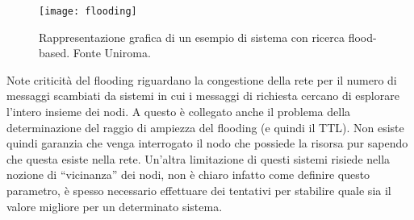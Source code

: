\begin{figure}[H]
 \centering
 \texttt{[image: flooding]}
 \caption{Rappresentazione grafica di un esempio di sistema con
  ricerca flood-based. Fonte Uniroma.}
\end{figure}

Note criticità del flooding riguardano la congestione della rete per il numero
di messaggi scambiati da sistemi in cui i messaggi di richiesta cercano di
esplorare l'intero insieme dei nodi. A questo è collegato anche il problema
della determinazione del raggio di ampiezza del flooding (e quindi il TTL). Non
esiste  quindi garanzia che venga interrogato il nodo che possiede la risorsa
pur sapendo che questa  esiste nella rete. Un'altra limitazione di questi
sistemi risiede nella nozione di ``vicinanza'' dei nodi, non è chiaro infatto
come definire questo  parametro, è spesso necessario effettuare dei  tentativi
per stabilire quale sia il valore migliore per un determinato sistema.
